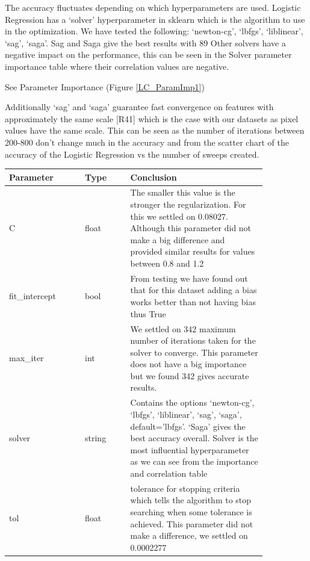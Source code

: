 \documentclass[11pt]{article}
\begin{document}
The accuracy fluctuates depending on which hyperparameters are used. Logistic Regression has a ‘solver’ hyperparameter in sklearn which is the algorithm to use in the optimization. We have tested the following: ‘newton-cg’, ‘lbfgs’, ‘liblinear’, ‘sag’, ‘saga’. Sag and Saga give the best results with 89%
Other solvers have a negative impact on the performance, this can be seen in the Solver parameter importance table where their correlation values are negative.

See Parameter Importance (Figure \ref{LC_ParamImp1})

Additionally ‘sag’ and ‘saga’ guarantee fast convergence on features with approximately the same scale [R41] which is the case with our datasets as pixel values have the same scale. This can be seen as the number of iterations between 200-800 don’t change much in the accuracy and from the scatter chart of the accuracy of the Logistic Regression vs the number of sweeps created.

\begin{table}[ht]
  \centering
  \begin{tabular}{|p{0.25\linewidth} | p{0.15 \linewidth} | p{0.45\linewidth}|} 
    \hline
    \textbf{Parameter} & \textbf{Type} & \textbf{Conclusion} \\ \hline
    C & float & The smaller this value is the stronger the regularization. For this we settled on 0.08027. Although this parameter did not make a big difference and provided similar results for values between 0.8 and 1.2 \\ \hline
    fit\_intercept & bool & From testing we have found out that for this dataset adding a bias works better than not having bias thus True  \\ \hline
    max\_iter & int &  We settled on 342 maximum number of iterations taken for the solver to converge. This parameter does not have a big importance but we found 342 gives accurate results. \\ \hline
    solver & string & Contains the options ‘newton-cg’, ‘lbfgs’, ‘liblinear’, ‘sag’, ‘saga’, default=’lbfgs’. ‘Saga’ gives the best accuracy overall. Solver is the most influential hyperparameter as we can see from the importance and correlation table \\ \hline
    tol & float & tolerance for stopping criteria which tells the algorithm to stop searching when some tolerance is achieved. This parameter did not make a difference, we settled on 0.0002277 \\ \hline


  \end{tabular}
\end{table}\label{RF_Analysis_Table}
\end{document}
